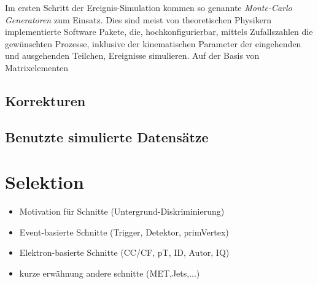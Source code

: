Im ersten Schritt der Ereignis-Simulation kommen so genannte
\textit{Monte-Carlo Generatoren} zum Einsatz. Dies sind meist von theoretischen
Physikern implementierte Software Pakete, die, hochkonfigurierbar, mittels
Zufallszahlen die gewünschten Prozesse, inklusive der kinematischen Parameter
der eingehenden und ausgehenden Teilchen, Ereignisse simulieren. Auf der Basis
von Matrixelementen


\subsection{Korrekturen}
\subsection{Benutzte simulierte Datensätze}



\section{Selektion}
\label{data_sim_selection:selection}

\begin{itemize}
    \item Motivation für Schnitte (Untergrund-Diskriminierung)
    \item Event-basierte Schnitte (Trigger, Detektor, primVertex)
    \item Elektron-basierte Schnitte (CC/CF, pT, ID, Autor, IQ)
    \item kurze erwähnung andere schnitte (MET,Jets,...)
\end{itemize}


